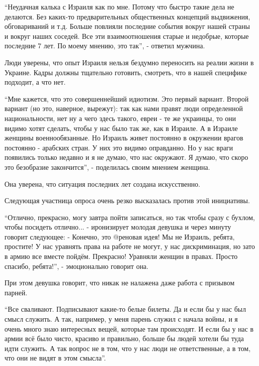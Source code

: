 \begin{multicols}{2}


\enquote{Неудачная калька с Израиля как по мне. Потому что быстро такие дела не
делаются. Без каких-то предварительных общественных концепций выдвижения,
обговариваний и т.д. Больше повлияли последние события вокруг нашей страны и
вокруг наших соседей. Все эти взаимоотношения старые и недобрые, которые
последние 7 лет. По моему мнению, это так}, - ответил мужчина.

Люди уверены, что опыт Израиля нельзя бездумно переносить на реалии жизни в
Украине. Кадры должны тщательно готовить, смотреть, что в нашей специфике
подходит, а что нет. 


\enquote{Мне кажется, что это совершеннейший идиотизм. Это первый вариант. Второй
вариант (но это, наверное, вырежут): так как нами правят люди определенной
национальности, нет ну а чего здесь такого, евреи - те же украинцы, то они
видимо хотят сделать, чтобы у нас было так же, как в Израиле. А в Израиле
женщины военнообязанные. Но Израиль живет постоянно в окружении врагов
постоянно - арабских стран. У них это видимо оправданно. Но у нас враги
появились только недавно и я не думаю, что нас окружают. Я думаю, что скоро это
безобразие закончится}, - поделилась своим мнением женщина. 

Она уверена, что ситуация последних лет создана искусственно.



Следующая участница опроса очень резко высказалась против этой инициативы.

\enquote{Отлично, прекрасно, могу завтра пойти записаться, но так чтобы сразу с бухлом,
чтобы посидеть отлично... - иронизирует молодая девушка и через минуту говорит
следующее: - Конечно, это @реновая идея! Мы не Израиль, ребята, простите! У нас
уравнять права на работе не могут, у нас дискриминация, но зато в армию все
вместе пойдём. Прекрасно! Уравняли женщин в правах. Просто спасибо, ребята!}, -
эмоционально говорит она. 

При этом девушка говорит, что никак не налажена даже работа с призывом парней.

\enquote{Все сваливают. Подписывают какие-то белые билеты. Да и если бы у нас был смысл
служить. А так, например, у меня парень служил с начала войны, и я очень много
знаю интересных вещей, которые там происходят. И если бы у нас в армии всё было
чисто, красиво и правильно, больше бы людей хотели бы туда идти служить. А так
вопрос не в том, что у нас люди не ответственные, а в том, что они не видят в
этом смысла}.


\end{multicols}
